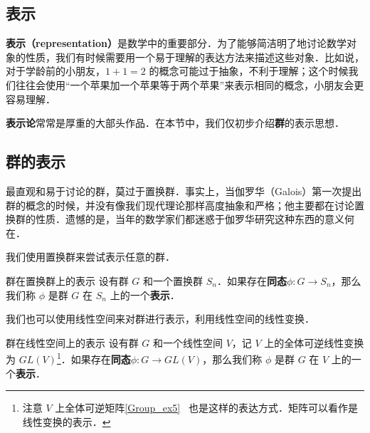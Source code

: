 
\begin{issues}
\end{issues}


\subsection{表示}

\textbf{表示（representation）}是数学中的重要部分．为了能够简洁明了地讨论数学对象的性质，我们有时候需要用一个易于理解的表达方法来描述这些对象．比如说，对于学龄前的小朋友，$1+1=2$ 的概念可能过于抽象，不利于理解；这个时候我们往往会使用“一个苹果加一个苹果等于两个苹果”来表示相同的概念，小朋友会更容易理解．

\textbf{表示论}常常是厚重的大部头作品．在本节中，我们仅初步介绍\textbf{群}的表示思想．

\subsection{群的表示}

最直观和易于讨论的群，莫过于置换群．事实上，当伽罗华（Galois）第一次提出群的概念的时候，并没有像我们现代理论那样高度抽象和严格；他主要都在讨论置换群的性质．遗憾的是，当年的数学家们都迷惑于伽罗华研究这种东西的意义何在．

我们使用置换群来尝试表示任意的群．

\begin{definition}{群在置换群上的表示}
设有群 $G$ 和一个置换群 $S_n$．如果存在\textbf{同态}$\phi: G\rightarrow S_n$，那么我们称 $\phi$ 是群 $G$ 在 $S_n$ 上的一个\textbf{表示}．
\end{definition}

我们也可以使用线性空间来对群进行表示，利用线性空间的线性变换．

\begin{definition}{群在线性空间上的表示}
设有群 $G$ 和一个线性空间 $V$，记 $V$ 上的全体可逆线性变换为 $GL(V)$\footnote{注意 $V$ 上全体可逆矩阵\autoref{Group_ex5}~ 也是这样的表达方式．矩阵可以看作是线性变换的表示．}．如果存在\textbf{同态}$\phi: G\rightarrow GL(V)$，那么我们称 $\phi$ 是群 $G$ 在 $V$ 上的一个\textbf{表示}．
\end{definition}